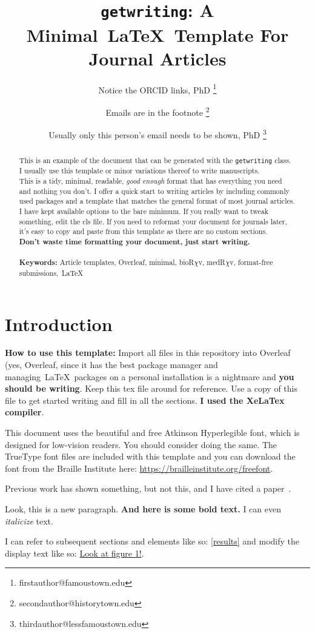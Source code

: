 \documentclass{getwriting}
\title{\lstinline{getwriting}: A Minimal~\LaTeX~Template For Journal Articles}
\author[1,2]{Notice the ORCID links, PhD \orcidlink{xxxx-xxxx-xxxx-xxxx} \thanks{firstauthor@famoustown.edu}}
\author[3]{Emails are in the footnote \orcidlink{xxxx-xxxx-xxxx-xxxx} \thanks{secondauthor@historytown.edu}}
\author[1,3]{Usually only this person's email needs to be shown, PhD \orcidlink{xxxx-xxxx-xxxx-xxxx} \thanks{thirdauthor@lessfamoustown.edu}}
\affil[1]{\footnotesize Department of Science, University of Famoustown}
\affil[2]{\footnotesize Department of Mathematics, University of Lessfamoustown}
\affil[3]{\footnotesize Department of History, University of Historytown}
\begin{document}
\maketitle
\begin{abstract}
\noindent This is an example of the document that can be generated with the \lstinline{getwriting} class. I usually use this template or minor variations thereof to write manuscripts.\\
\noindent This is a tidy, minimal, readable, \textit{good enough} format that has everything you need and nothing you don't. I offer a quick start to writing articles by including commonly used packages and a template that matches the general format of most journal articles. I have kept available options to the bare minimum. If you really want to tweak something, edit the cls file. If you need to reformat your document for journals later, it's easy to copy and paste from this template as there are no custom sections.\\
\noindent \textbf{Don't waste time formatting your document, just start writing.}
\\\\
\textbf{Keywords:} Article templates, Overleaf, minimal, bioR$\chi$v, medR$\chi$v, format-free submissions,~\LaTeX

\end{abstract}
\section{Introduction}
\textbf{How to use this template: }Import all files in this repository into Overleaf (yes, Overleaf, since it has the best package manager and managing~\LaTeX~packages on a personal installation is a nightmare and \textbf{you should be writing}. Keep this tex file around for reference. Use a copy of this file to get started writing and fill in all the sections. \textbf{I used the XeLaTex compiler}. 
\par
This document uses the beautiful and free Atkinson Hyperlegible font, which is designed for low-vision readers. You should consider doing the same. The TrueType font files are included with this template and you can download the font from the Braille Institute here: \url{https://brailleinstitute.org/freefont}.
\par
Previous work has shown something, but not this, and I have cited a paper~\cite{scbonita}. 
\par
Look, this is a new paragraph. \textbf{And here is some bold text.} I can even \textit{italicize} text.
\par
I can refer to subsequent sections and elements like so: \hyperref[results]{\autoref{results}} and modify the display text like so: \hyperref[fig:figure1]{Look at figure 1!}.
\par
\end{document}
